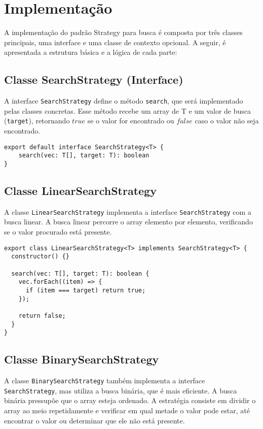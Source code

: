 \section{Implementação}

A implementação do padrão Strategy para busca é composta por três classes principais, uma interface e uma classe de contexto opcional. A seguir, é apresentada a estrutura básica e a lógica de cada parte:

\subsection{Classe SearchStrategy (Interface)}

A interface \texttt{SearchStrategy} define o método \texttt{search}, 
que será implementado pelas classes concretas. Esse método recebe um 
array de T e um valor de busca (\texttt{target}), 
retornando $true$ se o valor for encontrado ou $false$ caso o valor 
não seja encontrado.

\begin{verbatim}
export default interface SearchStrategy<T> {
    search(vec: T[], target: T): boolean
}
\end{verbatim}

\subsection{Classe LinearSearchStrategy}

A classe \texttt{LinearSearchStrategy} implementa a interface \texttt{SearchStrategy} 
com a busca linear. A busca linear percorre o array elemento por elemento, 
verificando se o valor procurado está presente.

\begin{verbatim}
export class LinearSearchStrategy<T> implements SearchStrategy<T> {
  constructor() {}

  search(vec: T[], target: T): boolean {
    vec.forEach((item) => {
      if (item === target) return true;
    });

    return false;
  }
}
\end{verbatim}

\subsection{Classe BinarySearchStrategy}

A classe \texttt{BinarySearchStrategy} também implementa a interface 
\texttt{SearchStrategy}, mas utiliza a busca binária, que é mais 
eficiente. A busca binária pressupõe que o array esteja ordenado. 
A estratégia consiste em dividir o array ao meio repetidamente e verificar 
em qual metade o valor pode estar, até encontrar o valor ou determinar 
que ele não está presente.

